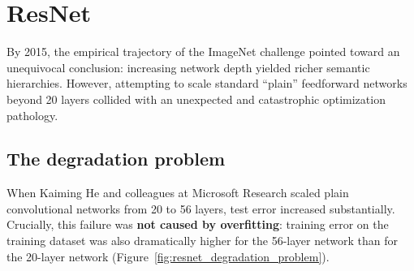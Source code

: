 \section{ResNet}
\label{sec:resnet_model}

By 2015, the empirical trajectory of the ImageNet challenge pointed toward an unequivocal conclusion: increasing network depth yielded richer semantic hierarchies. However, attempting to scale standard ``plain'' feedforward networks beyond 20 layers collided with an unexpected and catastrophic optimization pathology.

\subsection{The degradation problem}
\label{sec:resnet_degradation_problem}

When Kaiming He and colleagues at Microsoft Research scaled plain convolutional networks from 20 to 56 layers, test error increased substantially. Crucially, this failure was \textbf{not caused by overfitting}: training error on the training dataset was also dramatically higher for the 56-layer network than for the 20-layer network (Figure~\ref{fig:resnet_degradation_problem}).

